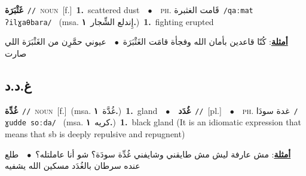 \documentclass[10pt,a4paper,twoside]{article} %
\begin{document}
\begin{multicols}{2}
{{{{\setlength\topsep{0pt}\textbf{\foreignlanguage{arabic}{غَثْبَرَة}}\ {\color{gray}\texttt{//}\color{black}}\ \textsc{noun}\ [f.]\ \textbf{1.}~scattered dust\ \ $\bullet$\ \ \textsc{ph.} \color{gray} \foreignlanguage{arabic}{قَامت الغثبرة}\color{black}\ {\color{gray}\texttt{/{\sffamily qaːmat ʔilɣaθbara}/}\color{black}}\ \color{gray} (msa. \foreignlanguage{arabic}{إِندلع الشِّجار}~\foreignlanguage{arabic}{\textbf{١.}})\color{black}\ \textbf{1.}~fighting erupted\  \begin{flushright}\color{gray}\foreignlanguage{arabic}{\textbf{\underline{\foreignlanguage{arabic}{أمثلة}}}: كُنّا قاعدين بأمان الله وفجأة قامَت الغَثْبَرَة\ $\bullet$\ \  عيوني حمَّرِن من الغَثْبَرَة اللي صارت}\end{flushright}\color{black}} \vspace{2mm}

\vspace{-3mm}
\subsection*{\color{blue}\foreignlanguage{arabic}{غ.د.د}\color{blue}{}} 

{\setlength\topsep{0pt}\textbf{\foreignlanguage{arabic}{غُدِّة}}\ {\color{gray}\texttt{//}\color{black}}\ \textsc{noun}\ [f.]\ \color{gray}(msa. \foreignlanguage{arabic}{غُدَّة}~\foreignlanguage{arabic}{\textbf{١.}})\color{black}\ \textbf{1.}~gland\ \ $\bullet$\ \ \setlength\topsep{0pt}\textbf{\foreignlanguage{arabic}{غُدَد}}\ {\color{gray}\texttt{//}\color{black}}\ [pl.]\ \ $\bullet$\ \ \textsc{ph.} \color{gray} \foreignlanguage{arabic}{غدة سودَا}\color{black}\ {\color{gray}\texttt{/{\sffamily ɣudde soːda}/}\color{black}}\ \color{gray} (msa. \foreignlanguage{arabic}{كريه}~\foreignlanguage{arabic}{\textbf{١.}})\color{black}\ \textbf{1.}~black gland (It is an idiomatic expression that means that sb is deeply repulsive and repugnent)\  \begin{flushright}\color{gray}\foreignlanguage{arabic}{\textbf{\underline{\foreignlanguage{arabic}{أمثلة}}}: مش عارفة ليش مش طايقني وشايفني غُدِّة سودَة؟ شو أنا عاملتله؟\ $\bullet$\ \  طلع عنده سرطان بالغُدَد مسكين الله يشفيه}\end{flushright}\color{black}} \vspace{2mm}

}}}
\end{multicols}
\end{document}
